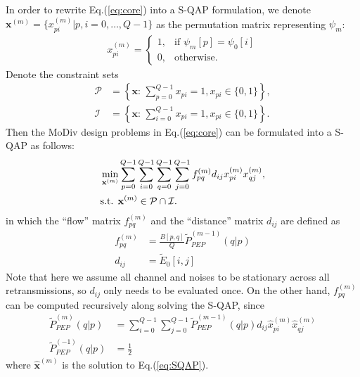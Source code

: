 \documentclass{article}
\begin{document}
In order to rewrite Eq.(\ref{eq:core}) into a S-QAP formulation, we
denote $\mathbf{x}^{(m)} = \{x_{pi}^{(m)}|p,i=0,\ldots,Q-1\}$ as the
permutation matrix representing $\psi_m$:
\begin{align}
  x_{pi}^{(m)} = \left\{\begin{array}{ll}
        1,& \mbox{if $\psi_m[p] = \psi_0[i]$}\\
        0,& \mbox{otherwise.} 
   \end{array} \right.
\end{align}
Denote the constraint sets
\begin{subequations}
  \begin{align}
    \mathcal{P} & = \left\{\mathbf{x}:\,\sum_{p=0}^{Q-1}x_{pi} = 1,
    x_{pi}\in\{0, 1\}\right\}, \\
    \mathcal{I} & = \left\{\mathbf{x}:\,\sum_{i=0}^{Q-1}x_{pi} = 1,
    x_{pi}\in\{0, 1\}\right\}. 
    \label{eq:constraint}
  \end{align}
\end{subequations}
Then the MoDiv design problems in Eq.(\ref{eq:core}) can be formulated into a
S-QAP as follows:
\begin{subequations}
  \begin{align}
    & \min_{\mathbf{x}^{(m)}}\sum_{p=0}^{Q-1}\sum_{i=0}^{Q-1}
    \sum_{q=0}^{Q-1}\sum_{j=0}^{Q-1}f_{pq}^{(m)}d_{ij}x_{pi}^{(m)}x_{qj}^{(m)},
    \label{eq:SQAP}\\
    & \mbox{s.t. } \mathbf{x}^{(m)}\in \mathcal{P}\cap\mathcal{I}. \notag
  \end{align}
\end{subequations}
in which the ``flow'' matrix $f_{pq}^{(m)}$ and the ``distance'' matrix $d_{ij}$
are defined as
\begin{subequations}
  \begin{align}
    f_{pq}^{(m)} & = \frac{B[p,q]}{Q}\tilde{P}_{PEP}^{(m-1)}(q|p) \\
    d_{ij}  & = \tilde{E}_0[i,j]
  \end{align}
\end{subequations}
Note that here we assume all channel and noises to be stationary across all
retransmissions, so $d_{ij}$ only needs to be evaluated once. On the other hand,
$f_{pq}^{(m)}$ can be computed recursively along solving the S-QAP, since
\begin{subequations}
  \begin{align}
    \tilde{P}_{PEP}^{(m)}(q|p) & = \sum_{i=0}^{Q-1}
    \sum_{j=0}^{Q-1}\tilde{P}_{PEP}^{(m-1)}(q|p)d_{ij}\hat{x}_{pi}^{(m)}\hat{x}_{qj}^{(m)}
    \\
    \tilde{P}_{PEP}^{(-1)}(q|p) & = \frac{1}{2}
  \end{align}
\end{subequations}
where $\hat{\mathbf{x}}^{(m)}$ is the solution to Eq.(\ref{eq:SQAP}). 
\end{document}
